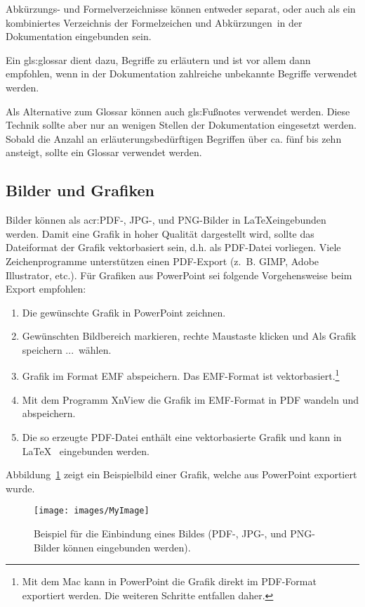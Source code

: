 Abkürzungs- und Formelverzeichnisse können entweder separat, oder auch als ein kombiniertes \glqq Verzeichnis der Formelzeichen und Abkürzungen\grqq~in der Dokumentation eingebunden sein.

Ein \gls{gls:glossar} dient dazu, Begriffe zu erläutern und ist vor allem dann empfohlen, wenn in der Dokumentation zahlreiche unbekannte Begriffe verwendet werden. 

Als Alternative zum Glossar können auch \glspl{gls:Fußnote} verwendet werden. Diese Technik sollte aber nur an wenigen Stellen der Dokumentation eingesetzt werden. Sobald die Anzahl an erläuterungsbedürftigen Begriffen über ca. fünf bis zehn ansteigt, sollte ein Glossar verwendet werden.

\subsection{Bilder und Grafiken}

Bilder können als \acrshort{acr:PDF}-, JPG-, und PNG-Bilder in \LaTeX eingebunden werden. Damit eine Grafik in hoher Qualität dargestellt wird, sollte das Dateiformat der Grafik vektorbasiert sein, d.h. als PDF-Datei vorliegen. Viele Zeichenprogramme unterstützen einen PDF-Export (z.~B. GIMP, Adobe Illustrator, etc.). Für Grafiken aus PowerPoint sei folgende Vorgehensweise beim Export empfohlen:

\begin{enumerate}
	\item Die gewünschte Grafik in PowerPoint zeichnen.
	\item Gewünschten Bildbereich markieren, rechte Maustaste klicken und \glqq Als Grafik speichern ...\grqq~wählen.
	\item Grafik im Format EMF abspeichern. Das EMF-Format ist vektorbasiert.\footnote{Mit dem Mac kann in PowerPoint die Grafik direkt im PDF-Format exportiert werden. Die weiteren Schritte entfallen daher.}
	\item Mit dem Programm XnView die Grafik im EMF-Format in PDF wandeln und abspeichern.
	\item Die so erzeugte PDF-Datei enthält eine vektorbasierte Grafik und kann in \LaTeX~ eingebunden werden.
\end{enumerate}

Abbildung~\ref{fig:MyImage} zeigt ein Beispielbild einer Grafik, welche aus PowerPoint exportiert wurde.

\begin{figure}[hbt]
	\centering
	\texttt{[image: images/MyImage]}
	\caption[Beispiel für die Einbindung eines Bildes.]{Beispiel für die Einbindung eines Bildes (PDF-, JPG-, und PNG-Bilder können eingebunden werden).}
	\label{fig:MyImage}
\end{figure}

